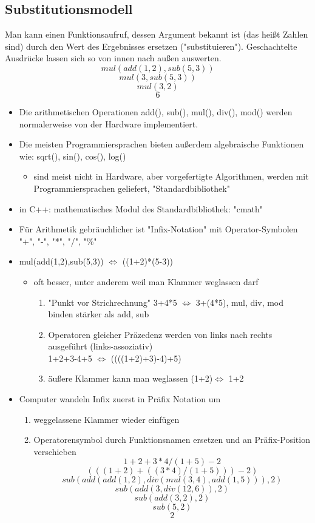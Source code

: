 \documentclass[a4paper]{scrartcl}
\theoremstyle{definition}
\theoremstyle{plain}
\theoremstyle{remark}
\theoremstyle{remark}
\begin{document}
\subsection{Substitutionsmodell}
\label{sec-4-1}
Man kann einen Funktionsaufruf, dessen Argument bekannt ist (das heißt Zahlen sind) durch den Wert des Ergebnisses ersetzen ("substituieren"). Geschachtelte Ausdrücke lassen sich so von innen nach außen auswerten.
\[mul(add(1,2),sub(5,3))\]
\[mul(3,sub(5,3))\]
\[mul(3,2)\]
\[6\]
\begin{itemize}
\item Die arithmetischen Operationen add(), sub(), mul(), div(), mod() werden normalerweise von der Hardware implementiert.
\item Die meisten Programmiersprachen bieten außerdem algebraische Funktionen wie: sqrt(), sin(), cos(), log()
\begin{itemize}
\item sind meist nicht in Hardware, aber vorgefertigte Algorithmen, werden mit Programmiersprachen geliefert, "Standardbibliothek"
\end{itemize}
\item in C++: mathematisches Modul des Standardbibliothek: "cmath"
\item Für Arithmetik gebräuchlicher ist "Infix-Notation" mit Operator-Symbolen "+", "-", "*", "/", "\%"
\item mul(add(1,2),sub(5,3)) $\iff$ ((1+2)*(5-3))
\begin{itemize}
\item oft besser, unter anderem weil man Klammer weglassen darf
\begin{enumerate}
\item "Punkt vor Strichrechnung" 3+4*5 $\iff$ 3+(4*5), mul, div, mod binden stärker als add, sub
\item Operatoren gleicher Präzedenz werden von links nach rechts ausgeführt (links-assoziativ) \\
                  1+2+3-4+5 $\iff$ ((((1+2)+3)-4)+5)
\item äußere Klammer kann man weglassen (1+2)$\iff$ 1+2
\end{enumerate}
\end{itemize}
\item Computer wandeln Infix zuerst in Präfix Notation um
\begin{enumerate}
\item weggelassene Klammer wieder einfügen
\item Operatorensymbol durch Funktionsnamen ersetzen und an Präfix-Position verschieben
\[1 + 2 + 3 * 4 / (1 + 5) - 2\]
\[(((1 + 2) + ((3 * 4) / (1 + 5))) - 2)\]
\[sub(add(add(1,2),div(mul(3,4),add(1,5))), 2)\]
\[sub(add(3,div(12,6)), 2)\]
\[sub(add(3,2), 2)\]
\[sub(5, 2)\]
\[2\]
\end{enumerate}
\end{itemize}
\end{document}
